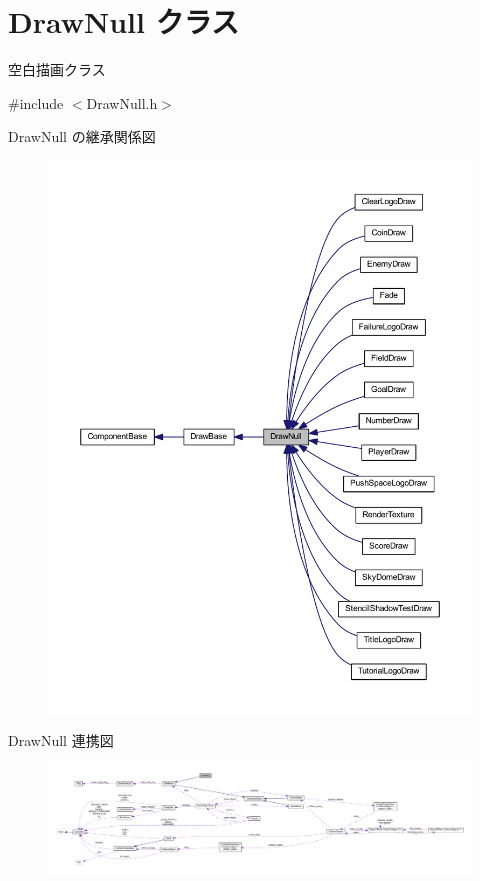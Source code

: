 \hypertarget{class_draw_null}{}\section{Draw\+Null クラス}
\label{class_draw_null}


空白描画クラス  




{\ttfamily \#include $<$Draw\+Null.\+h$>$}



Draw\+Null の継承関係図
\nopagebreak
\begin{figure}[H]
\begin{center}
\leavevmode
\includegraphics[width=350pt]{class_draw_null__inherit__graph}
\end{center}
\end{figure}


Draw\+Null 連携図\nopagebreak
\begin{figure}[H]
\begin{center}
\leavevmode
\includegraphics[width=350pt]{class_draw_null__coll__graph}
\end{center}
\end{figure}
